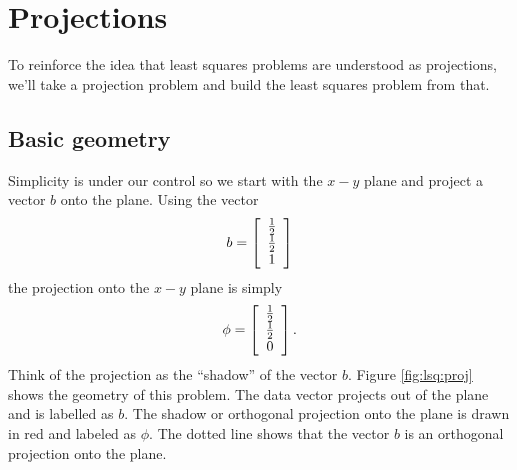 \section{Projections}

To reinforce the idea that least squares problems are understood as projections, we'll take a projection problem and build the least squares problem from that.

\subsection{Basic geometry}
Simplicity is under our control so we start with the $x-y$ plane and project a vector $b$ onto the plane. Using the vector
\begin{equation}
  b = \mat{c}{\frac{1}{2}\\\frac{1}{2}\\1}
\end{equation}
the projection onto the $x-y$ plane is simply
\begin{equation}
  \phi = \mat{c}{\frac{1}{2}\\\frac{1}{2}\\0}.
\end{equation}
Think of the projection as the ``shadow'' of the vector $b$. Figure \eqref{fig:lsq:proj} shows the geometry of this problem. The data vector projects out of the plane and is labelled as $b$. The shadow or orthogonal projection onto the plane is drawn in red and labeled as $\phi$. The dotted line shows that the vector $b$ is an orthogonal projection onto the plane.

